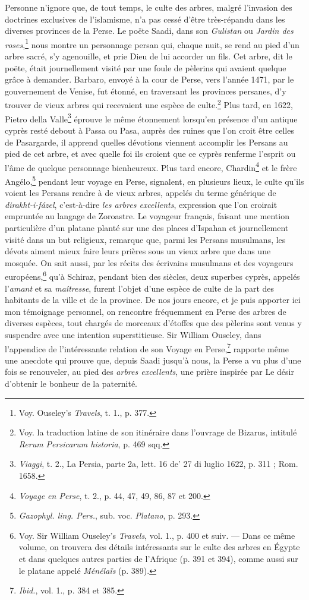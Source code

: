 \documentclass[a4paper, 11pt, oneside, polutonikogreek, french]{article}
\begin{document}
Personne n'ignore que, de tout temps, le culte des arbres, malgré l'invasion des doctrines exclusives de l'islamisme, n'a pas cessé d'être très-répandu dans les diverses provinces de la Perse. Le poëte Saadi, dans son \emph{Gulistan} ou \emph{Jardin des roses},\footnote{Voy. Ouseley's \emph{Travels}, t. 1., p. 377.} nous montre un personnage persan qui, chaque nuit, se rend au pied d'un arbre sacré, s'y agenouille, et prie Dieu de lui accorder un fils. Cet arbre, dit le poëte, était journellement visité par une foule de pèlerins qui avaient quelque grâce à demander. Barbaro, envoyé à la cour de Perse, vers l'année 1471, par le gouvernement de Venise, fut étonné, en traversant les provinces persanes, d'y trouver de vieux arbres qui recevaient une espèce de culte.\footnote{Voy. la traduction latine de son itinéraire dans l'ouvrage de Bizarus, intitulé \emph{Rerum Persicarum historia}, p. 469 sqq.} Plus tard, en 1622, Pietro della Valle\footnote{\emph{Viaggi}, t. 2., La Persia, parte 2a, lett. 16 de' 27 di luglio 1622, p. 311 ; Rom. 1658.} éprouve le même étonnement lorsqu'en présence d'un antique cyprès resté debout à Passa ou Pasa, auprès des ruines que l'on croit être celles de Pasargarde, il apprend quelles dévotions viennent accomplir les Persans au pied de cet arbre, et avec quelle foi ils croient que ce cyprès renferme l'esprit ou l'âme de quelque personnage bienheureux. Plus tard encore, Chardin\footnote{\emph{Voyage en Perse}, t. 2., p. 44, 47, 49, 86, 87 et 200.} et le frère Angélo,\footnote{\emph{Gazophyl. ling. Pers.}, sub. voc. \emph{Platano}, p. 293.} pendant leur voyage en Perse, signalent, en plusieurs lieux, le culte qu'ils voient les Persans rendre à de vieux arbres, appelés du terme générique de \emph{dirakht-i-fázel}, c'est-à-dire \emph{les arbres excellents}, expression que l'on croirait empruntée au langage de Zoroastre. Le voyageur français, faisant une mention particulière d'un platane planté sur une des places d'Ispahan et journellement visité dans un but religieux, remarque que, parmi les Persans musulmans, les dévots aiment mieux faire leurs prières sous un vieux arbre que dans une mosquée. On sait aussi, par les récits des écrivains musulmans et des voyageurs européens,\footnote{Voy. Sir William Ouseley's \emph{Travels}, vol. 1., p. 400 et suiv. --- Dans ce même volume, on trouvera des détails intéressants sur le culte des arbres en Égypte et dans quelques autres parties de l'Afrique (p. 391 et 394), comme aussi sur le platane appelé \emph{Ménélaïs} (p. 389).} qu'à Schiraz, pendant bien des siècles, deux superbes cyprès, appelés l'\emph{amant} et sa \emph{maîtresse}, furent l'objet d'une espèce de culte de la part des habitants de la ville et de la province. De nos jours encore, et je puis apporter ici mon témoignage personnel, on rencontre fréquemment en Perse des arbres de diverses espèces, tout chargés de morceaux d'étoffes que des pèlerins sont venus y suspendre avec une intention superstitieuse. Sir William Ouseley, dans l'appendice de l'intéressante relation de son Voyage en Perse,\footnote{\emph{Ibid.}, vol. 1., p. 384 et 385.} rapporte même une anecdote qui prouve que, depuis Saadi jusqu'à nous, la Perse a vu plus d'une fois se renouveler, au pied des \emph{arbres excellents}, une prière inspirée par Le désir d'obtenir le bonheur de la paternité.
\end{document}
